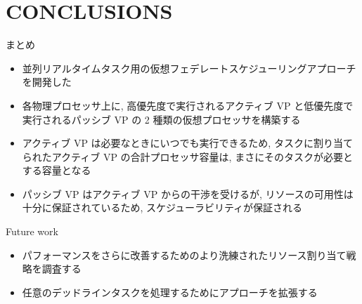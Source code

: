 
\section{CONCLUSIONS}
\label{sec: conclusions}

\begin{frame}{まとめ}
    \begin{itemize}
        \item 並列リアルタイムタスク用の仮想フェデレートスケジューリングアプローチを開発した
        \item 各物理プロセッサ上に, 高優先度で実行されるアクティブ VP と低優先度で実行されるパッシブ VP の 2 種類の仮想プロセッサを構築する
        \item アクティブ VP は必要なときにいつでも実行できるため, タスクに割り当てられたアクティブ VP の合計プロセッサ容量は, まさにそのタスクが必要とする容量となる
        \item パッシブ VP はアクティブ VP からの干渉を受けるが, リソースの可用性は十分に保証されているため, スケジューラビリティが保証される
    \end{itemize}
\end{frame}

\begin{frame}{Future work}
    \begin{itemize}
        \item パフォーマンスをさらに改善するためのより洗練されたリソース割り当て戦略を調査する
        \item 任意のデッドラインタスクを処理するためにアプローチを拡張する
    \end{itemize}
\end{frame}
